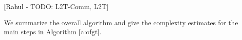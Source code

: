 [Rahul - TODO: L2T-Comm, L2T]

%
%


We summarize the overall algorithm and give the complexity estimates for the main steps in Algorithm \ref{a:ofgt}.  

